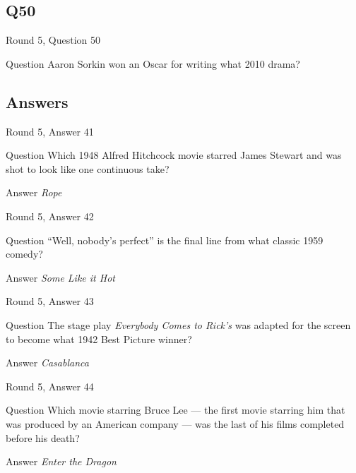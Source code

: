 \documentclass[11pt]{beamer}
\begin{document}
\subsection*{Q50}
\begin{frame}[t]{Round 5, Question 50}
\vspace{2em}
\begin{block}{Question}
Aaron Sorkin won an Oscar for writing what 2010 drama?
\end{block}
\end{frame}
    
\subsection{Answers}

\begin{frame}[t]{Round 5, Answer 41}
\vspace{2em}
\begin{block}{Question}
Which 1948 Alfred Hitchcock movie starred James Stewart and was shot to look like one continuous take?
\end{block}
\pause{}
\begin{block}{Answer}
\emph{Rope}
\end{block}
\end{frame}
    

\begin{frame}[t]{Round 5, Answer 42}
\vspace{2em}
\begin{block}{Question}
``Well, nobody's perfect'' is the final line from what classic 1959 comedy?
\end{block}
\pause{}
\begin{block}{Answer}
\emph{Some Like it Hot}
\end{block}
\end{frame}
    

\begin{frame}[t]{Round 5, Answer 43}
\vspace{2em}
\begin{block}{Question}
The stage play \emph{Everybody Comes to Rick's} was adapted for the screen to become what 1942 Best Picture winner?
\end{block}
\pause{}
\begin{block}{Answer}
\emph{Casablanca}
\end{block}
\end{frame}
    

\begin{frame}[t]{Round 5, Answer 44}
\vspace{2em}
\begin{block}{Question}
Which movie starring Bruce Lee — the first movie starring him that was produced by an American company — was the last of his films completed before his death?
\end{block}
\pause{}
\begin{block}{Answer}
\emph{Enter the Dragon}
\end{block}
\end{frame}
    
\end{document}
